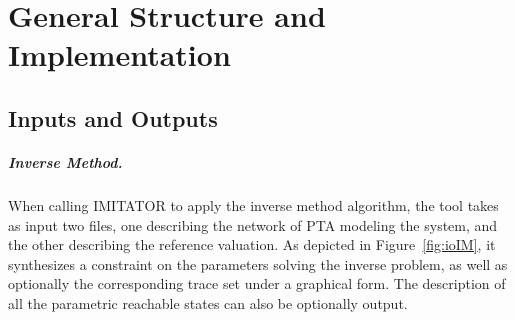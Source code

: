 \documentclass[a4paper,11pt]{report}
\newcommand{\imitator}{\textsf{IMITATOR}}
\newcommand{\paragraphe}[1]{\paragraph{#1.}}
\begin{document}
\chapter[Implementation]{General Structure and Implementation} \label{sec:implementation}



\section{Inputs and Outputs}



\paragraphe{Inverse Method}
When calling \imitator{} to apply the inverse method algorithm, the tool takes as input two files, one describing the network of PTA modeling the system, and the other describing the reference valuation.
As depicted in Figure~\ref{fig:ioIM}, it synthesizes a constraint on the parameters solving the inverse problem, as well as optionally the corresponding trace set under a graphical form.
The description of all the parametric reachable states can also be optionally output.
\end{document}
